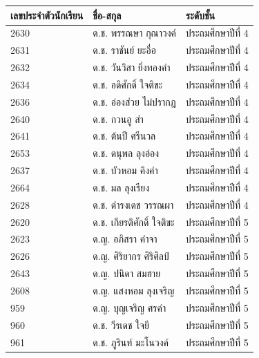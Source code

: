 \begin{table}[h]
    \begin{center}
        \begin{tabular}{ |p{3cm}|p{4cm}|p{3cm}| }
            \hline
            เลขประจำตัวนักเรียน & ชื่อ-สกุล & ระดับชั้น\\
            \hline
            2630 & ด.ช. พรรณษา กุณาวงค์ & ประถมศึกษาปีที่ 4\\
            \hline
            2631 & ด.ช. ราชันย์ ยะอื่อ & ประถมศึกษาปีที่ 4\\
            \hline
            2632 & ด.ช. วันวิสา ยิ่งทองคำ & ประถมศึกษาปีที่ 4\\
            \hline
            2634 & ด.ช. อดิศักดิ์ ใจติขะ & ประถมศึกษาปีที่ 4\\
            \hline
            2636 & ด.ช. อ่องส่วย ไม่ปรากฎ & ประถมศึกษาปีที่ 4\\
            \hline
            2640 & ด.ช. กวนอู ส่า & ประถมศึกษาปีที่ 4\\
            \hline
            2641 & ด.ช. ต้นปี ศรีนวล & ประถมศึกษาปีที่ 4\\
            \hline
            2653 & ด.ช. ดนุพล ลุงอ่อง & ประถมศึกษาปีที่ 4\\
            \hline
            2637 & ด.ช. บัวหอม คิงคำ & ประถมศึกษาปีที่ 4\\
            \hline
            2664 & ด.ช. มล ลุงเรียง & ประถมศึกษาปีที่ 4\\
            \hline
            2628 & ด.ช. ดำรงเดช วรรณผา & ประถมศึกษาปีที่ 4\\
            \hline
            2620 & ด.ช. เกียรติศักดิ์ ใจติขะ & ประถมศึกษาปีที่ 5\\
            \hline
            2623 & ด.ญ. อภิสรา คำจา & ประถมศึกษาปีที่ 5\\
            \hline
            2626 & ด.ญ. ศิริยากร ศิริศิลป์ & ประถมศึกษาปีที่ 5\\
            \hline
            2643 & ด.ญ. ปนิดา สมฮาย & ประถมศึกษาปีที่ 5\\
            \hline
            2608 & ด.ญ. แสงหอม ลุงเจริญ & ประถมศึกษาปีที่ 5\\
            \hline
            959 & ด.ญ. บุญเจริญ ศรคำ & ประถมศึกษาปีที่ 5\\
            \hline
            960 & ด.ช. วีรเดช ใจยี & ประถมศึกษาปีที่ 5\\
            \hline
            961 & ด.ช. ภูรินท์ มะโนวงค์ & ประถมศึกษาปีที่ 5\\
            \hline

\end{tabular}
\end{center}
\end{table}
